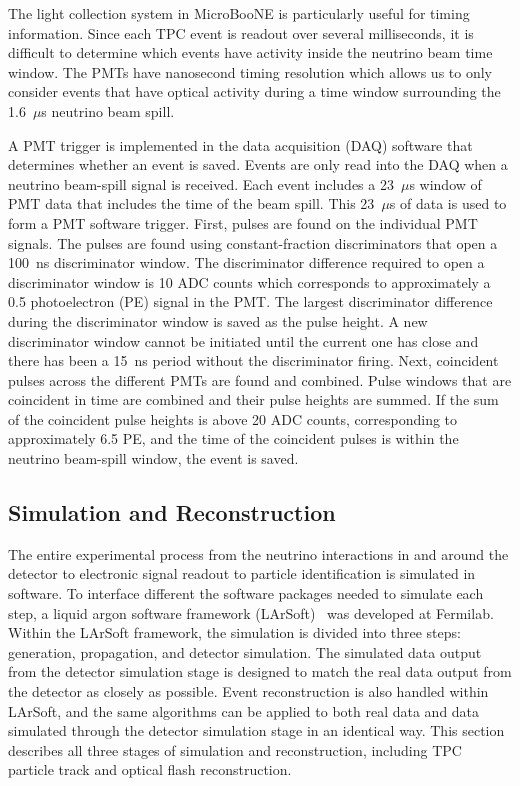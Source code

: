     The light collection system in MicroBooNE is particularly useful for timing
    information. Since each TPC event is readout over several milliseconds, it
    is difficult to determine which events have activity inside the neutrino
    beam time window. The PMTs have nanosecond timing resolution which allows
    us to only consider events that have optical activity during a time window
    surrounding the 1.6~$\mu$s neutrino beam spill. 

    A PMT trigger is implemented in the data acquisition (DAQ) software that
    determines whether an event is saved. Events are only read into the DAQ
    when a neutrino beam-spill signal is received. Each event includes a
    23~$\mu$s window of PMT data that includes the time of the beam spill.
    This 23~$\mu$s of data is used to form a PMT software trigger. First,
    pulses are found on the individual PMT signals. The pulses are found using
    constant-fraction discriminators that open a 100~ns discriminator window.
    The discriminator difference required to open a discriminator window is 10
    ADC counts which corresponds to approximately a 0.5 photoelectron (PE)
    signal in the PMT. The largest discriminator difference during the
    discriminator window is saved as the pulse height. A new discriminator
    window cannot be initiated until the current one has close and there has
    been a 15~ns period without the discriminator firing.  Next, coincident
    pulses across the different PMTs are found and combined.  Pulse windows
    that are coincident in time are combined and their pulse heights are
    summed. If the sum of the coincident pulse heights is above 20 ADC counts,
    corresponding to approximately 6.5 PE, and the time of the coincident
    pulses is within the neutrino beam-spill window, the event is saved.


\subsection{Simulation and Reconstruction}\label{sec:simreco}
  The entire experimental process from the neutrino interactions in and around
  the detector to electronic signal readout to particle identification is
  simulated in software. To interface different the software packages needed to
  simulate each step, a liquid argon software framework (LArSoft)~\cite{larsoft}
  was developed at Fermilab. Within the LArSoft framework, the simulation is
  divided into three steps: generation, propagation, and detector simulation.
  The simulated data output from the detector simulation stage is designed to
  match the real data output from the detector as closely as possible. Event
  reconstruction is also handled within LArSoft, and the same algorithms can be
  applied to both real data and data simulated through the detector simulation
  stage in an identical way. This section describes all three stages of
  simulation and reconstruction, including TPC particle track and optical flash
  reconstruction.

